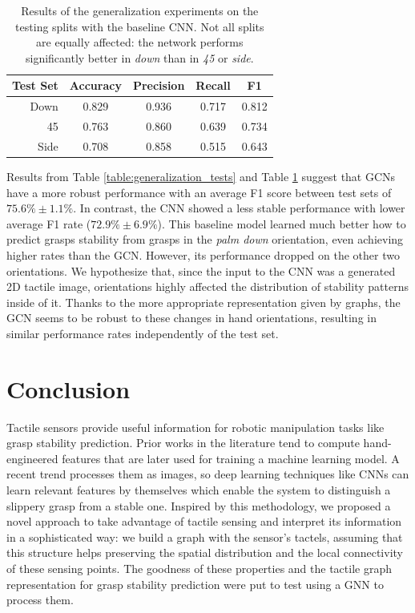 \begin{table}[h]
	\centering
	\caption{Results of the generalization experiments on the testing splits with the baseline \ac{CNN}. Not all splits are equally affected: the network performs significantly better in \emph{down} than in \emph{45} or \emph{side}.}
	\label{table:generalization_tests_cnn}
	\medskip
	\begin{tabular}{r|cccc}
		\hline
		\textbf{Test Set} & \textbf{Accuracy} & \textbf{Precision} & \textbf{Recall} & \textbf{F1}\\
		\hline
		Down & 0.829 & 0.936 & 0.717 & 0.812\\
		45 & 0.763 & 0.860 & 0.639 & 0.734\\
		Side & 0.708 & 0.858 & 0.515 & 0.643\\
		\hline
	\end{tabular}
\end{table}

Results from Table \ref{table:generalization_tests} and Table \ref{table:generalization_tests_cnn} suggest that \acp{GCN} have a more robust performance with an average F1 score between test sets of $75.6\% \pm 1.1\%$. In contrast, the \ac{CNN} showed a less stable performance with lower average F1 rate ($72.9\% \pm 6.9\%$). This baseline model learned much better how to predict grasps stability from grasps in the \textit{palm down} orientation, even achieving higher rates than the \ac{GCN}. However, its performance dropped on the other two orientations. We hypothesize that, since the input to the \ac{CNN} was a generated \acs{2D} tactile image, orientations highly affected the distribution of stability patterns inside of it. Thanks to the more appropriate representation given by graphs, the \ac{GCN} seems to be robust to these changes in hand orientations, resulting in similar performance rates independently of the test set.

\section{Conclusion}
\label{cha:tactile:sec:conclusion}

Tactile sensors provide useful information for robotic manipulation tasks like grasp stability prediction. Prior works in the literature tend to compute hand-engineered features that are later used for training a machine learning model. A recent trend processes them as images, so deep learning techniques like \acsp{CNN} can learn relevant features by themselves which enable the system to distinguish a slippery grasp from a stable one. Inspired by this methodology, we proposed a novel approach to take advantage of tactile sensing and interpret its information in a sophisticated way: we build a graph with the sensor's tactels, assuming that this structure helps preserving the spatial distribution and the local connectivity of these sensing points. The goodness of these properties and the tactile graph representation for grasp stability prediction were put to test using a \ac{GNN} to process them.

